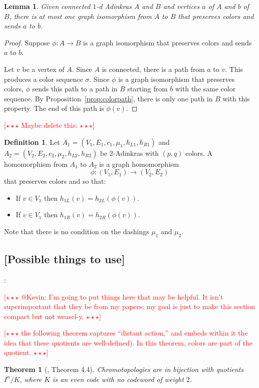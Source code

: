 \documentclass[12pt,twoside,singlespace]{article}
\numberwithin{equation}{section}
\newtheorem{thm}[equation]{Theorem}
\newtheorem{lem}[equation]{Lemma}
\theoremstyle{definition}
\newtheorem{definition}[equation]{Definition}
\newcommand{\com}[1]{\textcolor{red}{$[\star \star \star$ #1 $\star \star \star]$}}
\begin{document}
\begin{lem}
\label{lem:uniqueiso}
Given connected $1$-d Adinkras $A$ and $B$ and vertices $a$ of $A$ and $b$ of $B$, there is at most one graph isomorphism from $A$ to $B$ that preserves colors and sends $a$ to $b$.
\end{lem}
\begin{proof}
Suppose $\phi:A\to B$ is a graph isomorphism that preserves colors and sends $a$ to $b$.

Let $v$ be a vertex of $A$. Since $A$ is connected, there is a path from $a$ to $v$.  This produces a color sequence $\sigma$.  Since $\phi$ is a graph isomorphism that preserves colors, $\phi$ sends this path to a path in $B$ starting from $b$ with the same color sequence.  By Proposition~\ref{prop:colorpath}, there is only one path in $B$ with this property.  The end of this path is $\phi(v)$.
\end{proof}


\com{Maybe delete this:}


\begin{definition}
Let 
$A_1=(V_1,E_1,c_1,\mu_1,h_{L1},h_{R1})$
and
$A_2=(V_2,E_2,c_2,\mu_2,h_{L2},h_{R2})$
be 2-Adinkras with $(p,q)$ colors.  A homomorphism from $A_1$ to $A_2$ is a graph homomorphism
\[\phi:(V_1,E_1)\to (V_2,E_2)\]
that preserves colors and so that:
\begin{itemize}
\item If $v\in V_1$ then $h_{1L}(v)=h_{2L}(\phi(v))$.
\item If $v\in V_1$ then $h_{1R}(v)=h_{2R}(\phi(v))$.
\end{itemize}
Note that there is no condition on the dashings $\mu_1$ and $\mu_2$.
\end{definition}

\subsection{[Possible things to use]}:

\com{@Kevin: I'm going to put things here that may be helpful. It isn't superimportant that they be from my papers; my goal is just to make this section compact but not weasel-y.}


\com{the following theorem  captures ``distant action,'' and embeds within it the idea that these quotients are well-defined). In this theorem, colors are part of the quotient.}

\begin{thm}[\cite{zhang:adinkras}, Theorem 4.4]
\label{thm:chromotopology as quotient}
Chromotopologies are in bijection with quotients $I^n/K$, where $K$ is an even code with no codeword of weight $2$.
\end{thm}
\end{document}
